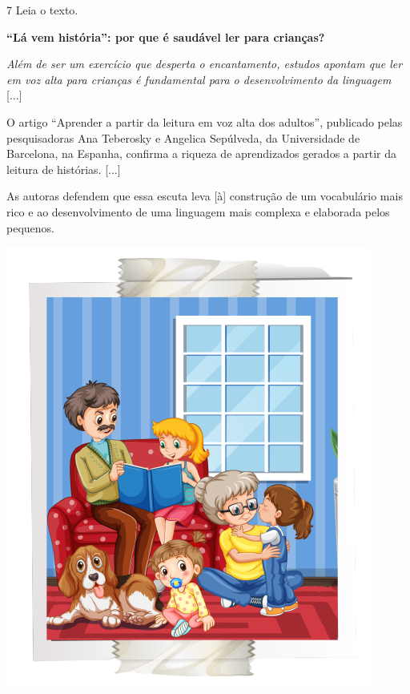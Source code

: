 \num{7} Leia o texto.

\begin{myquote}
\textbf{``Lá vem história'': por que é saudável ler para crianças?}

\emph{Além de ser um exercício que desperta o encantamento, estudos
apontam que ler em voz alta para crianças é fundamental para o
desenvolvimento da linguagem} {[}...{]}

O artigo ``Aprender a partir da leitura em voz alta dos adultos'',
publicado pelas pesquisadoras Ana Teberosky e Angelica Sepúlveda, da
Universidade de Barcelona, na Espanha, confirma a riqueza de
aprendizados gerados a partir da leitura de histórias. {[}...{]}

As autoras defendem que essa escuta leva {[}à{]} construção de um
vocabulário mais rico e ao desenvolvimento de uma linguagem mais
complexa e elaborada pelos pequenos.

\end{myquote}

\begin{center}
\includegraphics[width=.8\textwidth]{./media/image7a1.png}
\end{center}

